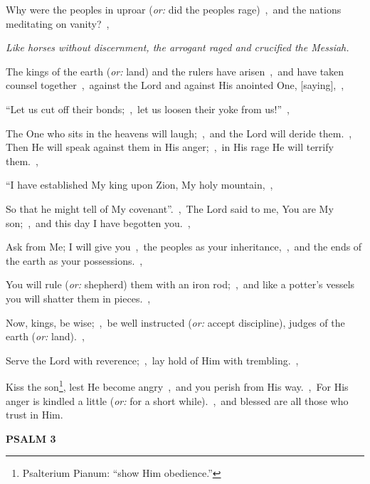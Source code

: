\documentclass[12pt,twoside,a5paper]{article}
\newcommand{\psalm}[1]{\textbf{PSALM {#1}}\nopagebreak}
\newcommand{\qanona}[1]{{\liturgicalhint{Qanona.} \emph{#1}}}
\newcommand{\translationoption}[1]{\emph{or:} #1}
\begin{document}
\begin{normalparskip}
  Why were the peoples in uproar (\translationoption{did the peoples rage})~\sep\ and the nations meditating on vanity?~\sep

  \qanona{Like horses without discernment, the arrogant raged and crucified the Messiah.}

  The kings of the earth (\translationoption{land}) and the rulers have arisen~\sep\ and have taken counsel together~\sep\ against the Lord and against His anointed One, [saying],~\sep

  ``Let us cut off their bonds;~\sep\ let us loosen their yoke from us!''~\sep

  The One who sits in the heavens will laugh;~\sep\ and the Lord will deride them.~\sep
  Then He will speak against them in His anger;~\sep\ in His rage He will terrify them.~\sep

  ``I have established My king upon Zion, My holy mountain,~\sep

  So that he might tell of My covenant''.~\sep\ The Lord said to me, You are My son;~\sep\ and this day I have begotten you.~\sep

  Ask from Me; I will give you~\sep\ the peoples as your inheritance,~\sep\ and the ends of the earth as your possessions.~\sep

  You will rule (\translationoption{shepherd}) them with an iron rod;~\sep\ and like a potter's vessels you will shatter them in pieces.~\sep

  Now, kings, be wise;~\sep\ be well instructed (\translationoption{accept discipline}), judges of the earth (\translationoption{land}).~\sep

  Serve the Lord with reverence;~\sep\ lay hold of Him with trembling.~\sep

  Kiss the son\footnote{Psalterium Pianum: ``show Him obedience.''}, lest He become angry~\sep\ and you perish from His way.~\sep\ For His anger is kindled a little (\translationoption{for a short while}).~\sep\ and blessed are all those who trust in Him.
\end{normalparskip}

\psalm{3}
\end{document}

